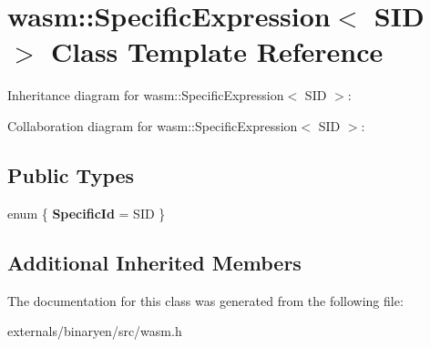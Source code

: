 \hypertarget{classwasm_1_1_specific_expression}{}\section{wasm\+:\+:Specific\+Expression$<$ S\+ID $>$ Class Template Reference}
\label{classwasm_1_1_specific_expression}


Inheritance diagram for wasm\+:\+:Specific\+Expression$<$ S\+ID $>$\+:


Collaboration diagram for wasm\+:\+:Specific\+Expression$<$ S\+ID $>$\+:
\subsection*{Public Types}
\begin{DoxyCompactItemize}
\item 
\mbox{\label{classwasm_1_1_specific_expression_a446f93656a82306b5dd537a95a76c535}} 
enum \{ {\bfseries Specific\+Id} = S\+ID
 \}
\end{DoxyCompactItemize}
\subsection*{Additional Inherited Members}


The documentation for this class was generated from the following file\+:\begin{DoxyCompactItemize}
\item 
externals/binaryen/src/wasm.\+h\end{DoxyCompactItemize}
